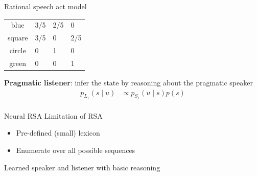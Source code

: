 \documentclass[usenames,dvipsnames,11pt,aspectratio=169]{beamer}
\begin{document}
\begin{frame}
    {Rational speech act model}
    \begin{center}

        \begin{tabular}{cp{2cm}p{2cm}p{2cm}}
        blue   & 3/5 & 2/5   & 0 \\
        square & 3/5 & 0     & 2/5 \\
        circle & 0   & 1   & 0 \\
        green  & 0   & 0     & 1 
        \end{tabular}
    \end{center}
    \textbf{Pragmatic listener}: infer the state by reasoning about the pragmatic speaker
    \begin{align*}
        p_{L_1}(s\mid u) &\propto p_{S_1}(u\mid s)p(s) \\
    \end{align*}
\end{frame}

\begin{frame}
    {Neural RSA}
    Limitation of RSA\\
    \begin{itemize}
        \item Pre-defined (small) lexicon
        \item Enumerate over all possible sequences
    \end{itemize}

    Learned speaker and listener with basic reasoning \mycite{[Andreas+ 2016]}
\end{frame}
\end{document}

